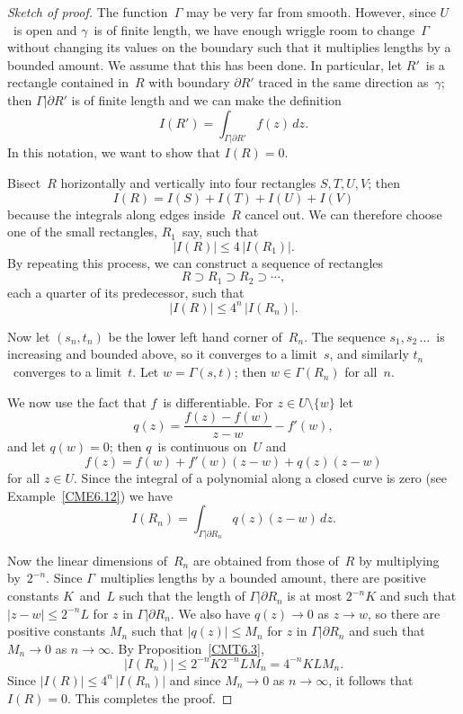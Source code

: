 \documentclass{amsproc}
\theoremstyle{definition}
\theoremstyle{remark}
\renewcommand{\d}{\partial}
\numberwithin{equation}{section}
\begin{document}
\begin{proof}[Sketch of proof]
The function~$ \Gamma $ may be very far from smooth. However, since $ U $~is open and $ \gamma $~is of finite length, we have enough wriggle room to change~$ \Gamma $ without
changing its values on the boundary such that it multiplies lengths by a bounded amount. We assume that this has been done. In particular, let $ R' $~is a rectangle contained
in~$ R $ with boundary $ \d R' $ traced in the same direction as~$ \gamma $; then $ \Gamma|\d R' $ is of finite length and we can make the definition
$$
I(R') = \int_{\Gamma|\d R'} f(z)\,dz.
$$
In this notation, we want to show that $ I(R) = 0 $.

Bisect~$ R $ horizontally and vertically into four rectangles $ S,T,U,V $; then
$$
I(R) = I(S) + I(T) + I(U) + I(V)
$$
because the integrals along edges inside~$ R $ cancel out. We can therefore choose one of the small rectangles, $ R_1 $~say, such that
$$
|I(R)| \leq 4 \,|I(R_1)|.
$$
By repeating this process, we can construct a sequence of rectangles
$$
R \supset R_1 \supset R_2 \supset \cdots,
$$
each a quarter of its predecessor, such that
$$
|I(R)| \leq 4^n\,|I(R_n)|.
$$

Now let $ (s_n,t_n) $ be the lower left hand corner of~$ R_n $. The sequence $ s_1,s_2\,\dots\, $ is increasing and bounded above, so it converges to a limit~$ s $, and
similarly $ t_n $~converges to a limit~$ t $. Let $ w = \Gamma(s,t) $; then $ w \in \Gamma(R_n) $ for all~$ n $.

We now use the fact that $ f $~is differentiable. For $ z \in U \setminus\{w\} $ let
$$
q(z) = \dfrac{f(z) - f(w)}{z - w} - f'(w),
$$
and let $ q(w) = 0 $; then $ q $~is continuous on~$ U $ and
$$
f(z) = f(w) + f'(w)(z - w) + q(z)(z - w)
$$
for all $ z \in U $. Since the integral of a polynomial along a closed curve is zero (see Example~\ref{CME6.12}) we have
$$
I(R_n) = \int_{\Gamma|\d R_n} q(z)(z - w)\,dz.
$$

Now the linear dimensions of~$ R_n $ are obtained from those of~$R$ by multiplying by~$ 2^{-n} $. Since $ \Gamma $~multiplies lengths by a bounded amount, there are positive
constants $ K $~and~$ L $ such that the length of $ \Gamma|\d R_n $ is at most $ 2^{-n}K $ and such that $ |z - w| \leq 2^{-n}L $ for $ z $ in $ \Gamma|\d R_n $.
We also have $ q(z) \to 0 $ as $ z \to w $, so there are positive constants $ M_n $ such that $ |q(z)| \leq M_n $ for $ z $ in $ \Gamma|\d R_n $ and such
that $ M_n \to 0 $ as $ n \to \infty $. By Proposition~\ref{CMT6.3},
$$
|I(R_n)| \leq 2^{-n}K2^{-n}LM_n = 4^{-n}KLM_n.
$$
Since $ |I(R)| \leq 4^n\,|I(R_n)| $ and since $ M_n \to 0 $ as $ n \to \infty $, it follows that $ I(R) = 0 $. This completes the proof.
\end{proof}
\end{document}
